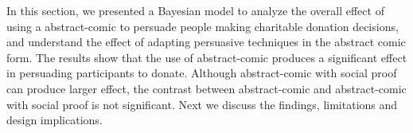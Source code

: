 In this section, we presented a Bayesian model to analyze the overall effect of using a abstract-comic to persuade people making charitable donation decisions, and understand the effect of adapting persuasive techniques in the abstract comic form. The results show that the use of abstract-comic produces a significant effect in persuading participants to donate. Although abstract-comic with social proof can produce larger effect, the contrast between abstract-comic and abstract-comic with social proof is not significant. Next we discuss the findings, limitations and design implications.
